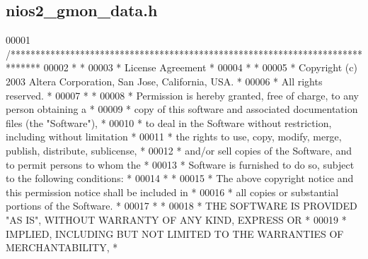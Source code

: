 \subsection{nios2\+\_\+gmon\+\_\+data.\+h}
\label{nios2__gmon__data_8h_source}

\begin{DoxyCode}
00001 \textcolor{comment}{/******************************************************************************}
00002 \textcolor{comment}{*                                                                             *}
00003 \textcolor{comment}{* License Agreement                                                           *}
00004 \textcolor{comment}{*                                                                             *}
00005 \textcolor{comment}{* Copyright (c) 2003 Altera Corporation, San Jose, California, USA.           *}
00006 \textcolor{comment}{* All rights reserved.                                                        *}
00007 \textcolor{comment}{*                                                                             *}
00008 \textcolor{comment}{* Permission is hereby granted, free of charge, to any person obtaining a     *}
00009 \textcolor{comment}{* copy of this software and associated documentation files (the "Software"),  *}
00010 \textcolor{comment}{* to deal in the Software without restriction, including without limitation   *}
00011 \textcolor{comment}{* the rights to use, copy, modify, merge, publish, distribute, sublicense,    *}
00012 \textcolor{comment}{* and/or sell copies of the Software, and to permit persons to whom the       *}
00013 \textcolor{comment}{* Software is furnished to do so, subject to the following conditions:        *}
00014 \textcolor{comment}{*                                                                             *}
00015 \textcolor{comment}{* The above copyright notice and this permission notice shall be included in  *}
00016 \textcolor{comment}{* all copies or substantial portions of the Software.                         *}
00017 \textcolor{comment}{*                                                                             *}
00018 \textcolor{comment}{* THE SOFTWARE IS PROVIDED "AS IS", WITHOUT WARRANTY OF ANY KIND, EXPRESS OR  *}
00019 \textcolor{comment}{* IMPLIED, INCLUDING BUT NOT LIMITED TO THE WARRANTIES OF MERCHANTABILITY,    *}

\end{DoxyCode}
